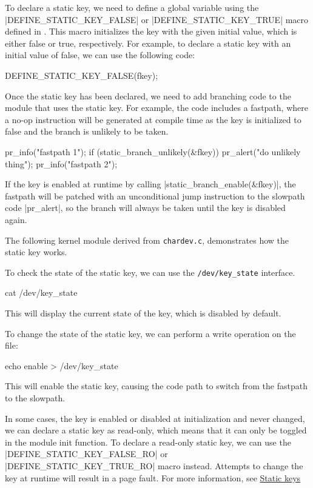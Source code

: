 \documentclass[10pt, oneside]{book}
\begin{document}
To declare a static key, we need to define a global variable using the \cpp|DEFINE_STATIC_KEY_FALSE| or \cpp|DEFINE_STATIC_KEY_TRUE| macro defined in .
This macro initializes the key with the given initial value, which is either false or true, respectively. For example, to declare a static key with an initial value of false, we can use the following code:

\begin{code}
DEFINE_STATIC_KEY_FALSE(fkey);
\end{code}

Once the static key has been declared, we need to add branching code to the module that uses the static key.
For example, the code includes a fastpath, where a no-op instruction will be generated at compile time as the key is initialized to false and the branch is unlikely to be taken.

\begin{code}
pr_info("fastpath 1\n");
if (static_branch_unlikely(&fkey))
    pr_alert("do unlikely thing\n");
pr_info("fastpath 2\n");
\end{code}

If the key is enabled at runtime by calling \cpp|static_branch_enable(&fkey)|, the fastpath will be patched with an unconditional jump instruction to the slowpath code \cpp|pr_alert|, so the branch will always be taken until the key is disabled again.

The following kernel module derived from \verb|chardev.c|, demonstrates how the static key works.


To check the state of the static key, we can use the \verb|/dev/key_state| interface.

\begin{codebash}
cat /dev/key_state
\end{codebash}

This will display the current state of the key, which is disabled by default.

To change the state of the static key, we can perform a write operation on the file:

\begin{codebash}
echo enable > /dev/key_state
\end{codebash}

This will enable the static key, causing the code path to switch from the fastpath to the slowpath.

In some cases, the key is enabled or disabled at initialization and never changed, we can declare a static key as read-only, which means that it can only be toggled in the module init function. To declare a read-only static key, we can use the \cpp|DEFINE_STATIC_KEY_FALSE_RO| or \cpp|DEFINE_STATIC_KEY_TRUE_RO| macro instead. Attempts to change the key at runtime will result in a page fault.
For more information, see \href{https://www.kernel.org/doc/Documentation/static-keys.txt}{Static keys}
\end{document}
